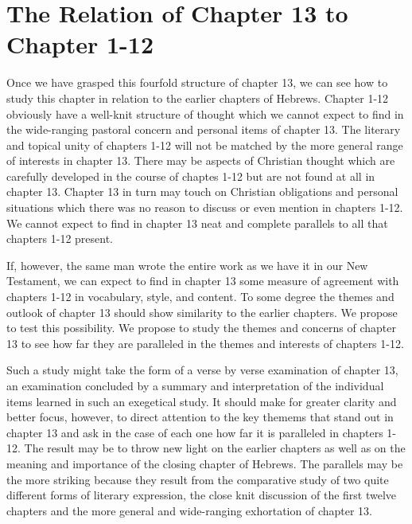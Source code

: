 \newpage
\section{The Relation of Chapter 13 to Chapter 1-12}
Once we have grasped this fourfold structure of chapter 13, we can see how to
study this chapter in relation to the earlier chapters of Hebrews.
Chapter 1-12 obviously have a well-knit structure of thought which we cannot
expect to find in the wide-ranging pastoral concern and personal items of
chapter 13.
The literary and topical unity of chapters 1-12 will not be matched by the more
general range of interests in chapter 13.
There may be aspects of Christian thought which are carefully developed in the
course of chaptes 1-12 but are not found at all in chapter 13.
Chapter 13 in turn may touch on Christian obligations and personal situations
which there was no reason to discuss or even mention in chapters 1-12.
We cannot expect to find in chapter 13 neat and complete parallels to all that
chapters 1-12 present.

If, however, the same man wrote the entire work as we have it in our New
Testament, we can expect to find in chapter 13 some measure of agreement with
chapters 1-12 in vocabulary, style, and content.
To some degree the themes and outlook of chapter 13 should show similarity to
the earlier chapters.
We propose to test this possibility.
We propose to study the themes and concerns of chapter 13 to see how far they
are paralleled in the themes and interests of chapters 1-12.

Such a study might take the form of a verse by verse examination of chapter 13,
an examination concluded by a summary and interpretation of the individual items
learned in such an exegetical study.
It should make for greater clarity and better focus, however, to direct
attention to the key themems that stand out in chapter 13 and ask in the case of
each one how far it is paralleled in chapters 1-12.
The result may be to throw new light on the earlier chapters as well as on the
meaning and importance of the closing chapter of Hebrews.
The parallels may be the more striking because they result from the comparative
study of two quite different forms of literary expression, the close knit
discussion of the first twelve chapters and the more general and wide-ranging
exhortation of chapter 13.
